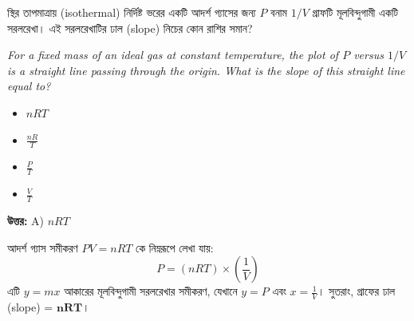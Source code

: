 \documentclass[12pt, a4paper]{article}
\begin{document}
\vspace{2em}

\begin{tcolorbox}[questionbox={প্রশ্ন (Question) 21}]
    \noindent
    স্থির তাপমাত্রায় (isothermal) নির্দিষ্ট ভরের একটি আদর্শ গ্যাসের জন্য $P$ বনাম $1/V$ গ্রাফটি মূলবিন্দুগামী একটি সরলরেখা। এই সরলরেখাটির ঢাল (slope) নিচের কোন রাশির সমান?
    
    \vspace{0.8em}
    \begin{english}
    \noindent\textit{\color{darkgray}
    For a fixed mass of an ideal gas at constant temperature, the plot of $P$ versus $1/V$ is a straight line passing through the origin. What is the slope of this straight line equal to?
    }
    \end{english}
\end{tcolorbox}

\begin{itemize}[label={}, leftmargin=1cm, itemsep=0.5em]
    \item[\textbf{A)}] $n R T$
    \item[\textbf{B)}] $\frac{n R}{T}$
    \item[\textbf{C)}] $\frac{P}{T}$
    \item[\textbf{D)}] $\frac{V}{T}$
\end{itemize}

\vspace{0.5em}
\begin{tcolorbox}[answerbox]
    \textbf{\color{success} উত্তর:} A) $n R T$
\end{tcolorbox}
\vspace{1em}

\begin{tcolorbox}[solutionbox={সমাধান (Solution)}]
    \noindent
    আদর্শ গ্যাস সমীকরণ $P V = n R T$ কে নিম্নরূপে লেখা যায়:
    \[ P = (n R T) \times \left(\frac{1}{V}\right) \]
    এটি $y = m x$ আকারের মূলবিন্দুগামী সরলরেখার সমীকরণ, যেখানে $y = P$ এবং $x = \frac{1}{V}$। সুতরাং, গ্রাফের ঢাল (slope) = $\mathbf{n R T}$।
\end{tcolorbox}

\vspace{2em}
\end{document}
